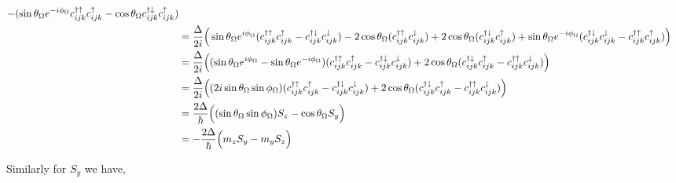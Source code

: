 \documentclass[10pt,prb,showpacs,amssymb,floatfix]{revtex4-1}
\newcommand{\dg}{\dagger}
\newcommand{\dna}{\downarrow}
\newcommand{\nn}{\nonumber}
\newcommand{\upa}{\uparrow}
\newcommand{\Dlt}{\Delta}
\newcommand{\Og}{\Omega}
\begin{document}
\begin{align}
- (  \sin\theta_\Og e^{-i\phi_\Og} c_{ijk}^{\dagger \uparrow} c_{ijk}^\uparrow - \cos\theta_\Og  c_{ijk}^{\dagger \downarrow} c_{ijk}^\uparrow ) \nn\\
& = \frac{\Dlt}{2i} \Big{(} \sin\theta_\Og e^{i\phi_\Og} ( c_{ijk}^{\dg\upa} c_{ijk}^{\upa}- c_{ijk}^{\dg\dna} c_{ijk}^{\dna})   - 2\cos\theta_\Og  (c_{ijk}^{\dg\upa} c_{ijk}^{\dna} )  + 2 \cos\theta_\Og ( c_{ijk}^{\dagger \dna} c_{ijk}^\uparrow ) +  \sin\theta_\Og e^{-i\phi_\Og} ( c_{ijk}^{\dagger \dna} c_{ijk}^\dna
-  c_{ijk}^{\dagger \uparrow} c_{ijk}^\uparrow)  \Big{)} \nn\\
& = \frac{\Dlt}{2i} \Big{(} (\sin\theta_\Og e^{i\phi_\Og} -  \sin\theta_\Og e^{-i\phi_\Og}) ( c_{ijk}^{\dg\upa} c_{ijk}^{\upa}- c_{ijk}^{\dg\dna} c_{ijk}^{\dna})     + 2 \cos\theta_\Og ( c_{ijk}^{\dagger \dna} c_{ijk}^\uparrow - c_{ijk}^{\dg\upa} c_{ijk}^{\dna} )  \Big{)} \nn\\
&=  \frac{\Dlt}{2i} \Big{(} (2 i \sin \theta_\Og\sin \phi_\Og) ( c_{ijk}^{\dg\upa} c_{ijk}^{\upa}- c_{ijk}^{\dg\dna} c_{ijk}^{\dna})     + 2 \cos\theta_\Og ( c_{ijk}^{\dagger \dna} c_{ijk}^\uparrow - c_{ijk}^{\dg\upa} c_{ijk}^{\dna} )  \Big{)} \nn\\
&= \frac{2\Dlt}{\hbar} \Big{(} ( \sin \theta_\Og\sin \phi_\Og)  S_z     -  \cos\theta_\Og S_y  \Big{)} \nn\\
&= - \frac{2\Dlt}{\hbar} \Big{(}  m_z S_y - m_y S_z    \Big{)}
\end{align}

Similarly for $S_y$ we have,
\end{document}
